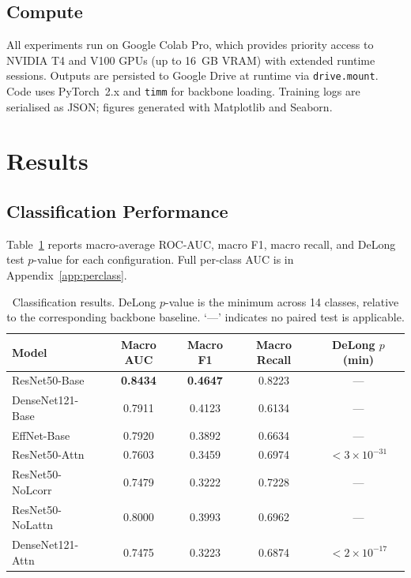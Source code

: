 \documentclass[12pt, a4paper]{article}
\begin{document}
\subsection{Compute}
All experiments run on Google Colab Pro, which provides priority access to NVIDIA T4 and
V100 GPUs (up to 16~GB VRAM) with extended runtime sessions. Outputs are persisted to
Google Drive at runtime via \texttt{drive.mount}. Code uses PyTorch~2.x and
\texttt{timm} for backbone loading. Training logs are serialised as JSON; figures
generated with Matplotlib and Seaborn.

\section{Results}

\subsection{Classification Performance}

Table~\ref{tab:classification} reports macro-average ROC-AUC, macro F1, macro recall, and
DeLong test $p$-value for each configuration. Full per-class AUC is in
Appendix~\ref{app:perclass}.

\begin{table}[H]
  \centering
  \caption{Classification results. DeLong $p$-value is the minimum across 14 classes,
           relative to the corresponding backbone baseline. `---' indicates no paired
           test is applicable.}
  \label{tab:classification}
  \begin{tabular}{lcccc}
    \toprule
    \textbf{Model} & \textbf{Macro AUC} & \textbf{Macro F1} &
      \textbf{Macro Recall} & \textbf{DeLong $p$ (min)} \\
    \midrule
    ResNet50-Base    & \textbf{0.8434} & \textbf{0.4647} & 0.8223 & ---  \\
    DenseNet121-Base & 0.7911 & 0.4123 & 0.6134 & ---  \\
    EffNet-Base      & 0.7920 & 0.3892 & 0.6634 & ---  \\
    \midrule
    ResNet50-Attn    & 0.7603 & 0.3459 & 0.6974 & $<3\times10^{-31}$ \\
    ResNet50-NoLcorr & 0.7479 & 0.3222 & 0.7228 & ---  \\
    ResNet50-NoLattn & 0.8000 & 0.3993 & 0.6962 & ---  \\
    DenseNet121-Attn & 0.7475 & 0.3223 & 0.6874 & $<2\times10^{-17}$ \\
    \bottomrule
  \end{tabular}
\end{table}
\end{document}
